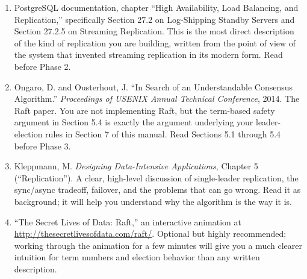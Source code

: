 \documentclass[11pt,a4paper]{article}
\begin{document}
\begin{enumerate}
\item PostgreSQL documentation, chapter ``High Availability, Load Balancing, and Replication,'' specifically Section 27.2 on Log-Shipping Standby Servers and Section 27.2.5 on Streaming Replication. This is the most direct description of the kind of replication you are building, written from the point of view of the system that invented streaming replication in its modern form. Read before Phase 2.

\item Ongaro, D. and Ousterhout, J. ``In Search of an Understandable Consensus Algorithm.'' \textit{Proceedings of USENIX Annual Technical Conference}, 2014. The Raft paper. You are not implementing Raft, but the term-based safety argument in Section 5.4 is exactly the argument underlying your leader-election rules in Section 7 of this manual. Read Sections 5.1 through 5.4 before Phase 3.

\item Kleppmann, M. \textit{Designing Data-Intensive Applications}, Chapter 5 (``Replication''). A clear, high-level discussion of single-leader replication, the sync/async tradeoff, failover, and the problems that can go wrong. Read it as background; it will help you understand why the algorithm is the way it is.

\item ``The Secret Lives of Data: Raft,'' an interactive animation at \url{http://thesecretlivesofdata.com/raft/}. Optional but highly recommended; working through the animation for a few minutes will give you a much clearer intuition for term numbers and election behavior than any written description.
\end{enumerate}

\footerboxes
\end{document}

